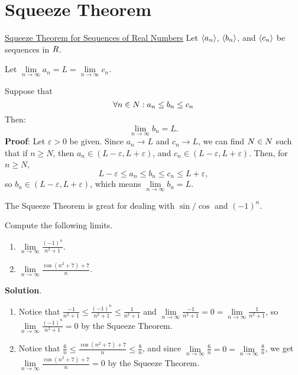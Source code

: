 \section{Squeeze Theorem}
\begin{Theorem}{\href{https://proofwiki.org/wiki/Squeeze_Theorem\#Sequences\_of\_Real\_Numbers}{Squeeze Theorem for Sequences of Real Numbers}}{}
    Let $ \langle a_n\rangle $, $ \langle b_n\rangle $, and $ \langle c_n\rangle $
    be sequences in $ \relax{R} $.\smallskip

    Let $ \lim\limits_{{n} \to {\infty}}a_n=L=\lim\limits_{{n} \to {\infty}}c_n $.\smallskip

    Suppose that
    \[ \forall n\in\relax{N}:a_n\le b_n\le c_n \]
    Then:
    \[ \lim\limits_{{n} \to {\infty}}b_n=L. \]
    \tcblower{}
    \textbf{Proof}: Let $ \varepsilon>0 $ be given.
    Since $ a_n\to L $ and $ c_n\to L $, we can find $ N\in\relax{N} $
    such that if $ n\ge N $, then $ a_n\in(L-\varepsilon,L+\varepsilon) $,
    and $ c_n\in(L-\varepsilon,L+\varepsilon) $. Then, for $ n\ge N $,
    \[ L-\varepsilon\le a_n\le b_n\le c_n\le L+\varepsilon, \]
    so $ b_n\in (L-\varepsilon,L+\varepsilon) $, which means
    $ \lim\limits_{{n} \to {\infty}}b_n=L $.
\end{Theorem}
\begin{Remark}{}{}
    The Squeeze Theorem is great for dealing with $ \sin/\cos $
    and $ (-1)^n $.
\end{Remark}
\begin{Example}{}{}
    Compute the following limits.
    \begin{enumerate}[(1)]
        \item $ \lim\limits_{{n} \to {\infty}}\frac{(-1)^n}{n^2+1} $.
        \item $ \lim\limits_{{n} \to {\infty}}\frac{\cos(n^2+7)+7}{n} $.
    \end{enumerate}
    \tcblower{}
    \textbf{Solution}.
    \begin{enumerate}[(1)]
        \item Notice that $ \frac{-1}{n^2+1}\le \frac{(-1)^n}{n^2+1}\le \frac{1}{n^2+1} $
              and $ \lim\limits_{{n} \to {\infty}}\frac{-1}{n^2+1}=0=\lim\limits_{{n} \to {\infty}}\frac{1}{n^2+1} $,
              so $ \lim\limits_{{n} \to {\infty}}\frac{(-1)^n}{n^2+1}=0 $ by the Squeeze Theorem.
        \item Notice that $ \frac{6}{n}\le \frac{\cos(n^2+7)+7}{n}\le \frac{8}{n} $,
              and since $ \lim\limits_{{n} \to {\infty}}\frac{6}{n}=0=\lim\limits_{{n} \to {\infty}}\frac{8}{n} $,
              we get $ \lim\limits_{{n} \to {\infty}}\frac{\cos(n^2+7)+7}{n}=0 $ by the Squeeze Theorem.
    \end{enumerate}
\end{Example}
